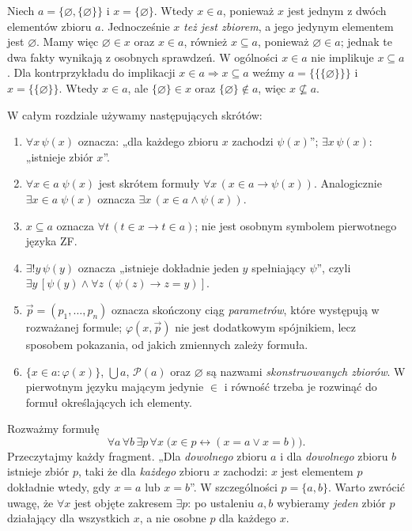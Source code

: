 \begin{przyklad}
Niech $a=\{\varnothing,\{\varnothing\}\}$
i $x=\{\varnothing\}$. Wtedy $x\in a$, ponieważ
$x$ jest jednym z dwóch elementów zbioru $a$.
Jednocześnie $x$ \emph{też jest zbiorem}, a jego
jedynym elementem jest $\varnothing$.
Mamy więc $\varnothing\in x$ oraz $x\in a$,
również $x\subseteq a$, ponieważ $\varnothing\in a$; jednak
te dwa fakty wynikają z osobnych sprawdzeń. W ogólności
$x\in a$ nie implikuje $x\subseteq a$.
Dla kontrprzykładu do implikacji $x\in a\Rightarrow x\subseteq a$
weźmy $a=\{\{\{\varnothing\}\}\}$ i $x=\{\{\varnothing\}\}$.
Wtedy $x\in a$, ale $\{\varnothing\}\in x$ oraz
$\{\varnothing\}\notin a$, więc $x\not\subseteq a$.
\end{przyklad}

\begin{definicja}\label{def:zf-notation-conventions}
W całym rozdziale używamy następujących skrótów:
\begin{enumerate}[label=(\roman*)]
\item $\forall x\,\psi(x)$ oznacza: „dla każdego zbioru $x$
      zachodzi $\psi(x)$”; $\exists x\,\psi(x)$: „istnieje zbiór $x$”.
\item $\forall x\in a\;\psi(x)$ jest skrótem formuły
      $\forall x\,(x\in a\to\psi(x))$.
      Analogicznie $\exists x\in a\;\psi(x)$ oznacza
      $\exists x\,(x\in a\land\psi(x))$.
\item $x\subseteq a$ oznacza
      $\forall t\,(t\in x\to t\in a)$; nie jest osobnym
      symbolem pierwotnego języka ZF.
\item $\exists!y\,\psi(y)$ oznacza „istnieje dokładnie
      jeden $y$ spełniający $\psi$”, czyli
      $\exists y\,[\psi(y)\land\forall z\,(\psi(z)\to z=y)]$.
\item $\vec p=(p_1,\ldots,p_n)$ oznacza skończony ciąg
      \emph{parametrów}, które występują w rozważanej formule;
      $\varphi(x,\vec p)$ nie jest dodatkowym spójnikiem,
      lecz sposobem pokazania, od jakich zmiennych zależy formuła.
\item $\{x\in a:\varphi(x)\}$, $\bigcup a$, $\mathcal P(a)$
      oraz $\varnothing$ są nazwami \emph{skonstruowanych zbiorów}.
      W pierwotnym języku mającym jedynie $\in$ i równość
      trzeba je rozwinąć do formuł określających ich elementy.
\end{enumerate}
\end{definicja}

\begin{przyklad}
Rozważmy formułę
\[
\forall a\,\forall b\,\exists p\,\forall x\;
\bigl(x\in p\leftrightarrow(x=a\lor x=b)\bigr).
\]
Przeczytajmy każdy fragment. „Dla \emph{dowolnego} zbioru $a$
i dla \emph{dowolnego} zbioru $b$ istnieje zbiór $p$,
taki że dla \emph{każdego} zbioru $x$ zachodzi:
$x$ jest elementem $p$ dokładnie wtedy, gdy $x=a$ lub $x=b$”.
W szczególności $p=\{a,b\}$. Warto zwrócić uwagę, że
$\forall x$ jest objęte zakresem $\exists p$: po ustaleniu
$a,b$ wybieramy \emph{jeden} zbiór $p$ działający dla
wszystkich $x$, a nie osobne $p$ dla każdego $x$.
\end{przyklad}

